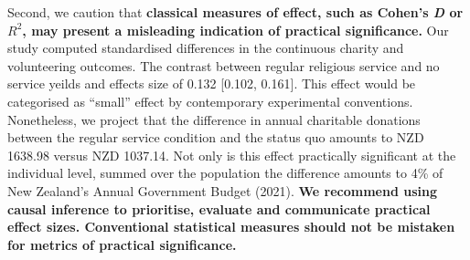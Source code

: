 \documentclass[
  single column]{article}
\begin{document}
Second, we caution that \textbf{classical measures of effect, such as
Cohen's \emph{D} or \(R^2\), may present a misleading indication of
practical significance.} Our study computed standardised differences in
the continuous charity and volunteering outcomes. The contrast between
regular religious service and no service yeilds and effects size of
0.132 {[}0.102, 0.161{]}. This effect would be categorised as ``small''
effect by contemporary experimental conventions. Nonetheless, we project
that the difference in annual charitable donations between the regular
service condition and the status quo amounts to NZD 1638.98 versus NZD
1037.14. Not only is this effect practically significant at the
individual level, summed over the population the difference amounts to
4\% of New Zealand's Annual Government Budget (2021). \textbf{We
recommend using causal inference to prioritise, evaluate and communicate
practical effect sizes. Conventional statistical measures should not be
mistaken for metrics of practical significance.}
\end{document}
